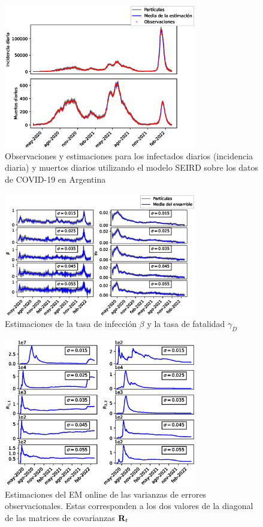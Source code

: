 \begin{figure}[h]
    \centering
    \includegraphics[width=0.75\textwidth]{figs/seird_online_em_aug_state_state_vars_arg_data.eps}
    \caption{Observaciones y estimaciones para los infectados diarios (incidencia diaria) y muertos diarios utilizando el modelo SEIRD sobre los datos de COVID-19 en Argentina}
    \label{fig:seird_vars_arg_data}
\end{figure}
\begin{figure}[h]
    \centering
    \includegraphics[width=0.75\textwidth]{figs/seird_online_em_aug_state_params_arg_data_sigmas.eps}
    \caption{Estimaciones de la tasa de infección $\beta$ y la tasa de fatalidad $\gamma_D$}
    \label{fig:seird_params_arg_data}
\end{figure}
\begin{figure}[h]
    \centering
    \includegraphics[width=0.75\textwidth]{figs/seird_online_em_aug_state_R_arg_data_sigmas.eps}
    \caption{Estimaciones del EM online de las varianzas de errores observacionales. Estas corresponden a los dos valores de la diagonal de las matrices de covarianzas $\mathbf{R}_t$}
    \label{fig:seird_R_arg_data}
\end{figure}


